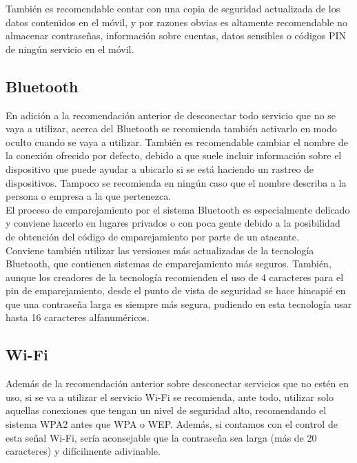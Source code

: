 \documentclass[11pt]{article}
\begin{document}
{También es recomendable contar con una copia de seguridad actualizada de los datos contenidos en el móvil, y por razones obvias es altamente recomendable no almacenar contraseñas, información sobre cuentas, datos sensibles o códigos PIN de ningún servicio en el móvil.}

\subsection{Bluetooth}

{En adición a la recomendación anterior de desconectar todo servicio que no se vaya a utilizar, acerca del Bluetooth se recomienda también activarlo en modo oculto cuando se vaya a utilizar. También es recomendable cambiar el nombre de la conexión ofrecido por defecto, debido a que suele incluir información sobre el dispositivo que puede ayudar a ubicarlo si se está haciendo un rastreo de dispositivos. Tampoco se recomienda en ningún caso que el nombre describa a la persona o empresa a la que pertenezca.} \\

{El proceso de emparejamiento por el sistema Bluetooth es especialmente delicado y conviene hacerlo en lugares privados o con poca gente debido a la posibilidad de obtención del código de emparejamiento por parte de un atacante.} \\

{Conviene también utilizar las versiones más actualizadas de la tecnología Bluetooth, que contienen sistemas de emparejamiento más seguros. También, aunque los creadores de la tecnología recomienden el uso de 4 caracteres para el pin de emparejamiento, desde el punto de vista de seguridad se hace hincapié en que una contraseña larga es siempre más segura, pudiendo en esta tecnología usar hasta 16 caracteres alfanuméricos.}

\subsection{Wi-Fi}

{Además de la recomendación anterior sobre desconectar servicios que no estén en uso, si se va a utilizar el servicio Wi-Fi se recomienda, ante todo, utilizar solo aquellas conexiones que tengan un nivel de seguridad alto, recomendando el sistema WPA2 antes que WPA o WEP. Además, si contamos con el control de esta señal Wi-Fi, sería aconsejable que la contraseña sea larga (más de 20 caracteres) y difícilmente adivinable.} \\
\end{document}
